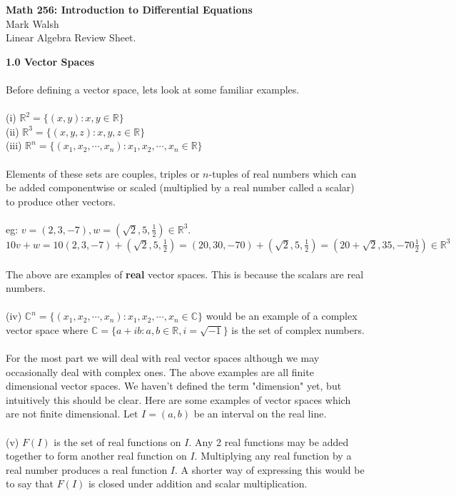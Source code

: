 \documentclass{amsart}
\begin{document}
\begin{center}
{\bfseries\large Math 256: Introduction to Differential Equations}\\
\vspace{0.5cm}
Mark Walsh\\
Linear Algebra Review Sheet.
 \end{center}
\vspace{1.0cm} 
{\bf 1.0 Vector Spaces}\\\\
Before defining a vector space, lets look at some familiar examples.\\\\
(i) $\mathbb{R}^{2}=\{(x,y):x,y\in \mathbb{R}\}$\\
(ii) $\mathbb{R}^{3}=\{(x,y,z):x,y,z\in \mathbb{R}\}$\\
(iii) $\mathbb{R}^{n}=\{(x_1,x_2,\cdots,x_n):x_1,x_2,\cdots,x_n\in \mathbb{R}\}$\\\\
Elements of these sets are couples, triples or $n$-tuples of real numbers which can be added componentwise or scaled (multiplied by a real number called a scalar) to produce other vectors.\\\\
eg: $v=(2,3,-7), w=(\sqrt{2}, 5, \frac{1}{2})\in\mathbb{R}^3$.\\
 $10v+w=10(2,3,-7)+(\sqrt{2}, 5, \frac{1}{2})=(20,30,-70)+(\sqrt{2}, 5, \frac{1}{2})=(20+\sqrt{2}, 35, -70\frac{1}{2})\in \mathbb{R}^3$\\
\\
The above are examples of {\bf real} vector spaces. This is because the scalars are real numbers.\\\\
(iv) $\mathbb{C}^{n}=\{(x_1,x_2,\cdots,x_n):x_1,x_2,\cdots,x_n\in \mathbb{C}\}$ would be an example of a complex vector space where $\mathbb{C}=\{a+ib:a,b\in\mathbb{R}, i=\sqrt{-1}\}$ is the set of complex numbers.\\
\\
For the most part we will deal with real vector spaces although we may occasionally deal with complex ones. The above examples are all finite dimensional vector spaces. We haven't defined the term "dimension" yet, but intuitively this should be clear. Here are some examples of vector spaces which are not finite dimensional. Let $I=(a,b)$ be an interval on the real line.\\
\\
(v) $F(I)$ is the set of real functions on $I$. Any 2 real functions may be added together to form another real function on $I$. Multiplying any real function by a real number produces a real function $I$. A shorter way of expressing this would be to say that $F(I)$ is closed under addition and scalar multiplication.\\
\end{document}
